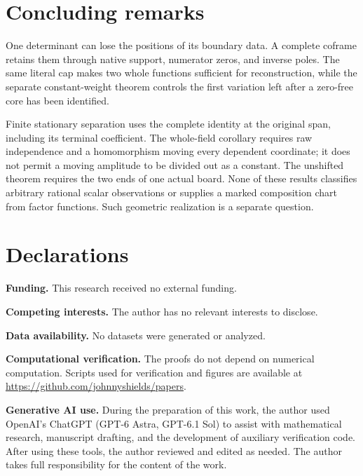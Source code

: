 \documentclass[11pt,a4paper]{amsart}
\numberwithin{equation}{section}
\theoremstyle{plain}
\theoremstyle{definition}
\begin{document}
\section{Concluding remarks}\label{sec:conclusion}

One determinant can lose the positions of its boundary data.  A complete
coframe retains them through native support, numerator zeros, and inverse
poles.  The same literal cap makes two whole functions sufficient for
reconstruction, while the separate constant-weight theorem controls the
first variation left after a zero-free core has been identified.

Finite stationary separation uses the complete identity at the original
span, including its terminal coefficient.  The whole-field corollary
requires raw independence and a homomorphism moving every dependent
coordinate; it does not permit a moving amplitude to be divided out as a
constant.  The unshifted theorem requires the two ends of one actual
board.  None of these results classifies arbitrary rational scalar
observations or supplies a marked composition chart from factor
functions.  Such geometric realization is a separate question.

\section*{Declarations}
{\footnotesize
\noindent\textbf{Funding.} This research received no external funding.

\smallskip
\noindent\textbf{Competing interests.} The author has no relevant interests to disclose.

\smallskip
\noindent\textbf{Data availability.} No datasets were generated or analyzed.

\smallskip
\noindent\textbf{Computational verification.} The proofs do not depend on numerical computation.  Scripts used for verification and figures are available at \url{https://github.com/johnnyshields/papers}.

\smallskip
\noindent\textbf{Generative AI use.} During the preparation of this work, the author used OpenAI's ChatGPT (GPT-6 Astra, GPT-6.1 Sol) to assist with mathematical research, manuscript drafting, and the development of auxiliary verification code.  After using these tools, the author reviewed and edited as needed.  The author takes full responsibility for the content of the work.\par}
\end{document}
